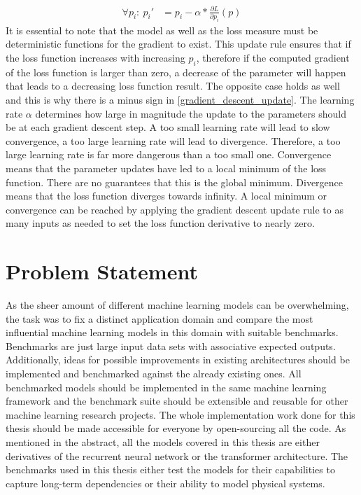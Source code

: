 \documentclass[draft,final]{vutinfth} %
\begin{document}
    \begin{align} 
        \label{gradient_descent_update}
        \forall p_i:~p_i' &= p_i - \alpha * \frac{\partial{L}}{\partial{p_i}}(p)
    \end{align}
    It is essential to note that the model as well as the loss measure must be deterministic functions for the gradient to exist.
    This update rule ensures that if the loss function increases with increasing $p_i$, therefore if the computed gradient of the loss function is larger than zero, a decrease of the parameter will happen that leads to a decreasing loss function result.
    The opposite case holds as well and this is why there is a minus sign in \ref{gradient_descent_update}.
    The learning rate $\alpha$ determines how large in magnitude the update to the parameters should be at each gradient descent step.
    A too small learning rate will lead to slow convergence, a too large learning rate will lead to divergence.
    Therefore, a too large learning rate is far more dangerous than a too small one.
    Convergence means that the parameter updates have led to a local minimum of the loss function.
    There are no guarantees that this is the global minimum. Divergence means that the loss function diverges towards infinity.
    A local minimum or convergence can be reached by applying the gradient descent update rule to as many inputs as needed to set the loss function derivative to nearly zero. 

    \section{Problem Statement}
    As the sheer amount of different machine learning models can be overwhelming, the task was to fix a distinct application domain and compare the most influential machine learning models in this domain with suitable benchmarks.
    Benchmarks are just large input data sets with associative expected outputs.
    Additionally, ideas for possible improvements in existing architectures should be implemented and benchmarked against the already existing ones.
    All benchmarked models should be implemented in the same machine learning framework and the benchmark suite should be extensible and reusable for other machine learning research projects.
    The whole implementation work done for this thesis should be made accessible for everyone by open-sourcing all the code.
    As mentioned in the abstract, all the models covered in this thesis are either derivatives of the recurrent neural network or the transformer \cite{Transformer} architecture.
    The benchmarks used in this thesis either test the models for their capabilities to capture long-term dependencies or their ability to model physical systems.
    
\end{document}
